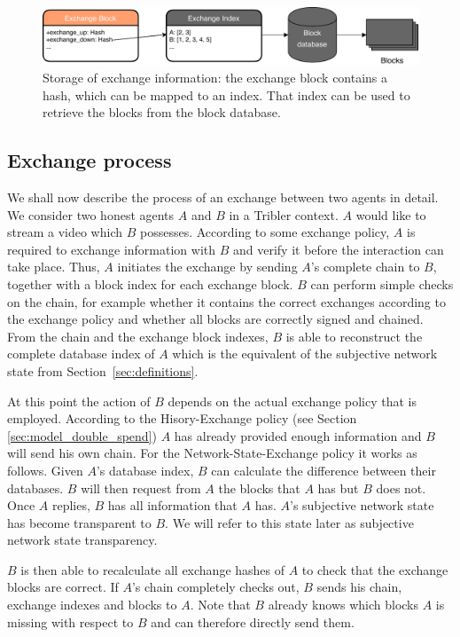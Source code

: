 \begin{figure}
    \centering
    \includegraphics[width=\textwidth]{images/exchange_block_retrieval.pdf}
    \caption{Storage of exchange information: the exchange block contains a hash, which can be mapped to an index. That index can be used to retrieve the blocks from the block database.}
    \label{fig:exchange_process}
\end{figure}

\subsection{Exchange process}
We shall now describe the process of an exchange between two agents in detail. We consider two honest 
agents $A$ and $B$ in a Tribler context. $A$ would like to stream a video which $B$ possesses. According
to some exchange policy, $A$ is required to exchange information with $B$ and verify it before the 
interaction can take place. Thus, $A$ initiates the exchange by sending $A$'s complete chain to $B$,
together with a block index for each exchange block.
$B$ can perform simple checks on the chain, for example whether it contains the correct exchanges 
according to the exchange policy and whether all blocks are correctly signed and chained. From the 
chain and the exchange block indexes, $B$ is able to reconstruct the complete database index of $A$ which 
is the equivalent of the subjective network state from Section~\ref{sec:definitions}. 

At this point the action of $B$ depends on the actual exchange policy that is employed. According to
the Hisory-Exchange policy (see Section \ref{sec:model_double_spend}) $A$ has already provided 
enough information and $B$ will send his own chain. For the Network-State-Exchange policy it works as
follows. Given $A$'s database index, $B$ can calculate the difference between their databases. $B$ will 
then request from $A$ the blocks that $A$ has but $B$ does not. Once $A$ replies, $B$ has all 
information that $A$ has. $A$'s subjective network state has become transparent to $B$. We will refer
to this state later as subjective network state transparency.

$B$ is then able to recalculate all exchange hashes of $A$ to check that 
the exchange blocks are correct. If $A$'s chain completely checks out, $B$ sends his chain, exchange
indexes and blocks to $A$. Note that $B$ already knows which blocks $A$ is missing with respect to 
$B$ and can therefore directly send them. 

